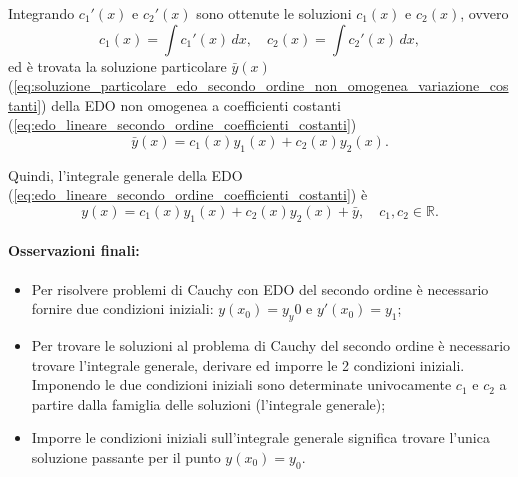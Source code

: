 Integrando $c_1'(x)$ e $c_2'(x)$ sono ottenute le soluzioni $c_1(x)$ e $c_2(x)$, ovvero
\begin{equation*}
	c_1(x) = \int c_1'(x)\, dx,\quad c_2(x) = \int c_2'(x)\, dx,
\end{equation*}
ed è trovata la soluzione particolare $\bar y(x)$ (\ref{eq:soluzione_particolare_edo_secondo_ordine_non_omogenea_variazione_costanti}) della EDO non omogenea a coefficienti costanti (\ref{eq:edo_lineare_secondo_ordine_coefficienti_costanti})
\begin{equation*}
	\bar{y}(x) = c_1(x) y_1(x) + c_2(x) y_2(x).
\end{equation*}

Quindi, l'integrale generale della EDO (\ref{eq:edo_lineare_secondo_ordine_coefficienti_costanti}) è
\begin{equation*}
	y(x) = c_1(x) y_1(x) + c_2(x) y_2(x) + \bar y,\quad c_1,c_2\in\mathbb{R}.
\end{equation*}

\paragraph{Osservazioni finali:} 
\begin{itemize}
	\item Per risolvere problemi di Cauchy con EDO del secondo ordine è necessario fornire due condizioni iniziali: $y(x_0)=y_y0$ e $y'(x_0)=y_1$;
	\item Per trovare le soluzioni al problema di Cauchy del secondo ordine è necessario trovare l'integrale generale, derivare ed imporre le 2 condizioni iniziali. Imponendo le due condizioni iniziali sono determinate univocamente $c_1$ e $c_2$ a partire dalla famiglia delle soluzioni (l'integrale generale);
	\item Imporre le condizioni iniziali sull'integrale generale significa trovare l'unica soluzione passante per il punto $y(x_0) = y_0$.
\end{itemize}


